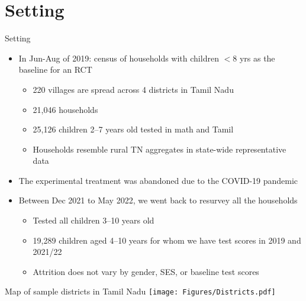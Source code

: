 \documentclass[aspectratio=169,numbering=none]{beamer}
\begin{document}
\section{Setting}
\begin{frame}[plain,label=setting]{Setting}
\begin{itemize}
\vfill\item In Jun-Aug of 2019: census of households with children $<8$ yrs as the baseline for an RCT
\begin{itemize}
\vfill\item 220 villages are spread across 4 districts in Tamil Nadu
\vfill\item 21,046 households
\vfill\item 25,126 children 2--7 years old tested in math and Tamil
\vfill\item Households resemble rural TN aggregates in state-wide representative data \hyperlink{representative}{}
\end{itemize}
\vfill\item The experimental treatment was abandoned due to the COVID-19 pandemic
\vfill\item Between Dec 2021 to May 2022, we went back to resurvey all the households
\begin{itemize}
\vfill\item Tested all children 3--10 years old
\vfill\item 19,289 children aged 4--10 years for whom we have test scores in 2019 and 2021/22
\vfill\item  Attrition does not vary by gender, SES, or baseline test scores \hyperlink{attrition}{}
\end{itemize}
\end{itemize}
\end{frame}

\begin{frame}[plain]{Map of sample districts in Tamil Nadu}
\centering
\texttt{[image: Figures/Districts.pdf]}
\end{frame}
\end{document}
